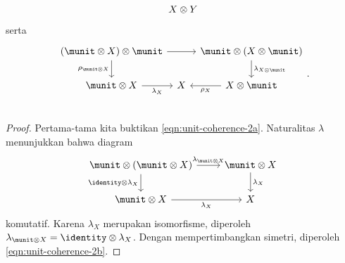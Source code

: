 \begin{lemma}[G.\ M.\ Kelly]
\begin{equation}
\begin{tikzcd}[column sep=tiny]
		& X \otimes Y &
	\end{tikzcd} \end{equation}
	serta
	\begin{equation}\label{eqn:unit-coherence-3} \begin{tikzcd}[column sep=tiny]
		(\munit \otimes X) \otimes \munit \arrow[d, "{\rho_{\munit \otimes X}}"'] \arrow[rr] & & \munit \otimes (X \otimes \munit) \arrow[d, "{\lambda_{X \otimes \munit}}"] \\
		\munit \otimes X \arrow[r, "{\lambda_X}"'] & X & X \otimes \munit \arrow[l, "{\rho_X}"] \\
	\end{tikzcd}. \end{equation}
\end{lemma}
\begin{proof}
	Pertama-tama kita buktikan \eqref{eqn:unit-coherence-2a}. Naturalitas $\lambda$ menunjukkan bahwa diagram
	\[ \begin{tikzcd}
		\munit \otimes (\munit \otimes X) \arrow[r, "{\lambda_{\munit \otimes X}}"] \arrow[d, "{\identity \otimes \lambda_X}"'] & \munit \otimes X \arrow[d, "{\lambda_X}"] \\
		\munit \otimes X \arrow[r, "{\lambda_X}"'] & X
	\end{tikzcd} \]
	komutatif. Karena $\lambda_X$ merupakan isomorfisme, diperoleh $\lambda_{\munit \otimes X} = \identity \otimes \lambda_X$. Dengan mempertimbangkan simetri, diperoleh \eqref{eqn:unit-coherence-2b}.


\end{proof}
